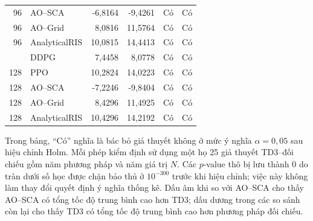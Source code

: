 \begin{landscape}
\begin{longtable}{r l r r c c}
96 & AO--SCA & -6,8164 & -9,4261 & Có & Có \\
96 & AO--Grid & 8,0816 & 11,5764 & Có & Có \\
96 & AnalyticalRIS & 10,0815 & 14,4413 & Có & Có \\
\addlinespace
128 & DDPG & 7,4458 & 8,0778 & Có & Có \\
128 & PPO & 10,2824 & 14,0223 & Có & Có \\
128 & AO--SCA & -7,2246 & -9,8404 & Có & Có \\
128 & AO--Grid & 8,4296 & 11,4925 & Có & Có \\
128 & AnalyticalRIS & 10,4296 & 14,2192 & Có & Có \\
\end{longtable}
\end{landscape}

\noindent Trong bảng, ``Có'' nghĩa là bác bỏ giả thuyết không ở mức ý nghĩa $\alpha=0{,}05$ sau hiệu chỉnh Holm. Mỗi phép kiểm định sử dụng một họ 25 giả thuyết TD3--đối chiếu gồm năm phương pháp và năm giá trị $N$. Các $p$-value thô bị lưu thành 0 do tràn dưới số học được chặn bảo thủ ở $10^{-300}$ trước khi hiệu chỉnh; việc này không làm thay đổi quyết định ý nghĩa thống kê. Dấu âm khi so với AO--SCA cho thấy AO--SCA có tổng tốc độ trung bình cao hơn TD3; dấu dương trong các so sánh còn lại cho thấy TD3 có tổng tốc độ trung bình cao hơn phương pháp đối chiếu.
